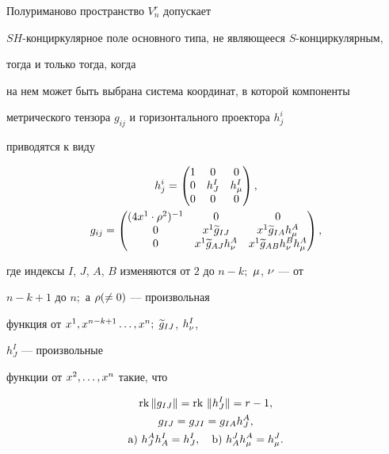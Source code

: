 \begin{thm}


Полуриманово пространство $V^r_n$ допускает


$SH$-конциркулярное поле основного типа, не являющееся $S$-конциркулярным,


тогда и только тогда, когда


на нем может быть выбрана система координат, в которой компоненты


метрического тензора $g_{ij}$ и горизонтального проектора $h_{j}^{i}$


приводятся к виду


\begin{gather*}


h_{j}^i=\begin{pmatrix}


1 & 0 &0 \\


0 & h_{J}^{I}&h_{\m}^{I}\\


0 & 0 & 0


\end{pmatrix}, \\


%


g_{ij}=\begin{pmatrix}


(4x^1\cdot {\ro}^2)^{-1} & 0& 0 \\


0 &x^1 \ti {g}_{IJ}&x^1 \ti {g}_{IA} h_{\m}^{A}\\


0& x^1\ti {g}_{AJ} h_{\n}^{A}& x^1 \ti {g}_{AB} h_{\n}^{B}h^A_\mu


\end{pmatrix},


\end{gather*}


где индексы $I$, $J$, $A$, $B$ изменяются от $2$ до $n-k;$ $\mu$, $\nu$ --- от


$n-k+1$ до $n;$ а $\rho(\ne 0)$ --- произвольная


функция от $x^1, x^{n-k+1}\dotsc, x^n;$ $\widetilde { g}_{IJ}$, $h_{\nu}^{I}$,


$h_{J}^{I}$ --- произвольные


функции от $x^2,\dotsc,x^n$ такие, что


\begin{gather*}


\mathrm {rk}\, \|g_{IJ}\|=\mathrm{rk}\ \|h_{J}^{I}\|=r-1, \\


g_{IJ}=g_{JI}=g_{IA} h_{J}^{A},\\


\mathrm a)\ h_{J}^{A}h_{A}^{I}=h_{J}^{I},\quad \mathrm b)\ h_{A}^{J}


h_{\m}^{A}=h_{\m}^{J}.


\end{gather*}


\end{thm}





